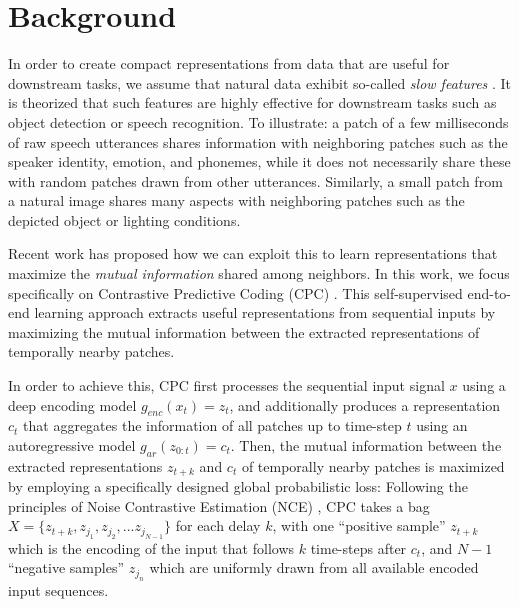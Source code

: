 \documentclass{article}
\newcommand{\ztk}{z_{t+k}}
\newcommand{\ct}{c_{t}}
\newcommand{\zt}{z_{t}}
\begin{document}
\section{Background}
\label{sec:CPC}
In order to create compact representations from data that are useful for downstream tasks, we assume that natural data exhibit so-called \textit{slow features} \citep{Wiskott2002-dn}. It is theorized that such features are highly effective for downstream tasks such as object detection or speech recognition. To illustrate: a patch of a few milliseconds of raw speech utterances shares information with neighboring patches such as the speaker identity, emotion, and phonemes, while it does not necessarily share these with random patches drawn from other utterances. Similarly, a small patch from a natural image shares many aspects with neighboring patches such as the depicted object or lighting conditions. 

Recent work \citep{oord2018representation,hjelm2018learning} has proposed how we can exploit this to learn representations that maximize the \textit{mutual information} shared among neighbors. In this work, we focus specifically on Contrastive Predictive Coding (CPC) \citep{oord2018representation}. This self-supervised end-to-end learning approach extracts useful representations from sequential inputs by maximizing the mutual information between the extracted representations of temporally nearby patches.

In order to achieve this, CPC first processes the sequential input signal $x$ using a deep encoding model $g_{enc}(x_t) = \zt$, and additionally produces a representation $c_t$ that aggregates the information of all patches up to time-step $t$ using an autoregressive model $g_{ar}(z_{0:t}) = c_t$. Then, the mutual information between the extracted representations $\ztk$ and $\ct$ of temporally nearby patches is maximized by employing a specifically designed global probabilistic loss: Following the principles of Noise Contrastive Estimation (NCE) \citep{gutmann2010noise}, CPC takes a bag $X=\{z_{t+k}, z_{j_1}, z_{j_2}, ... z_{j_{N-1}}\}$ for each delay $k$, with one ``positive sample'' $z_{t+k}$ which is the encoding of the input that follows $k$ time-steps after $c_t$, and $N-1$ ``negative samples'' $z_{j_n}$ which are uniformly drawn from all available encoded input sequences.
\end{document}
